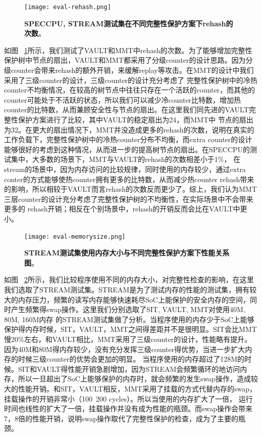 \begin{figure}[!htp]
    \centering
    \texttt{[image: eval-rehash.png]}
    \caption{\textbf{SPECCPU, STREAM测试集在不同完整性保护方案下rehash的次数}。}
   \label{fig:eval-rehash}
\end{figure}
如图 ~\ref{fig:eval-rehash}所示，我们测试了VAULT和MMT中rehash的次数。为了能够增加完整性保护树中节点的扇出，VAULT和MMT都采用了分级counter的设计思路。因为分级counter会带来rehash的额外开销，来缓解replay等攻击。在MMT的设计中我们采用了三级counter的设计，三级counter的设计充分考虑了
完整性保护树中的冷热counter不均衡情况，在较高的树节点中往往只存在一个活跃的counter，而其他的counter可能处于不活跃的状态，所以我们可以减少冷counter比特数，增加热counter的比特数，从而兼顾安全性与节点的扇出。在这里我们同先进的VAULT完整性保护方案进行了比较，其中VAULT的稳定扇出为24，而MMT中
节点的扇出为32。在更大的扇出情况下，MMT并没造成更多的rehash的次数，说明在真实的工作负载下，完整性保护树中的冷热counter分布不均衡，而extra counter的设计能够很好的考虑到这种情况，从而进一步的提高树节点的扇出。在SPECCPU的测试集中，大多数的场景下，MMT与VAULT的rehash的次数相差小于1\%，
在stream的场景中，因为内存访问的比较规律，同时使用的内存较少，通过extra conter的方式能够使热counter拥有更多的比特数，从而减少热counter rehash带来的影响，所以相较于VAULT而言rehash的次数反而更少了。综上，我们认为MMT三层counter的设计充分考虑了完整性保护树的不均衡性，在实际场景中不会带来更多的
rehash开销；相反在个别场景中，rehash的开销反而会比在VAULT中更小。

\begin{figure}[!htp]
    \centering
    \texttt{[image: eval-memorysize.png]}
    \caption{\textbf{STREAM测试集使用内存大小与不同完整性保护方案下性能关系图}。}
   \label{fig:eval-memorysize}
\end{figure}
如图 ~\ref{fig:eval-memorysize}所示，我们比较程序使用不同的内存大小，对完整性检查的影响，在这里我们选取了STREAM测试集。STREAM是为了测试内存的性能的测试集，拥有较大的内存压力，频繁的读写内存能够快速耗尽SoC上能保护的安全内存的空间，同时产生频繁得swap操作。这里我们分别选取了SIT, VAULT, MMT对使用40M, 80M, 160M内存
的STREAM测试集做了分析。当程序使用的内存少于SoC上能够保护得内存时候，SIT，VAULT，MMT之间得差距并不是很明显。SIT会比MMT慢20\%左右，和VAULT相比，MMT采用了三级counter的设计，性能略有提升。因为40M和80M得内存较少，没有充分发挥三级counter得优势，当进一步扩大内存的时候三级counter的优势会更加的明显。
当程序使用的内存超过了128M的时候。SIT和VAULT得性能开销急剧增加，因为STREAM会频繁循环的地访问内存，所以一旦超出了SoC上能够保护的内存时，就会频繁的发生swap操作，造成较大的性能开销。和SIT，VAULT相反，MMT采用了挂载的方式代替内存的swap，挂载操作的开销非常小（100~200 cycles）。所以当使用的内存扩大了一倍，
运行时间也线性的扩大了一倍，挂载操作并没有成为性能的瓶颈。而swap操作会带来7，8倍的性能开销，说明swap操作取代了完整性保护的检查，成为了主要的瓶颈。

